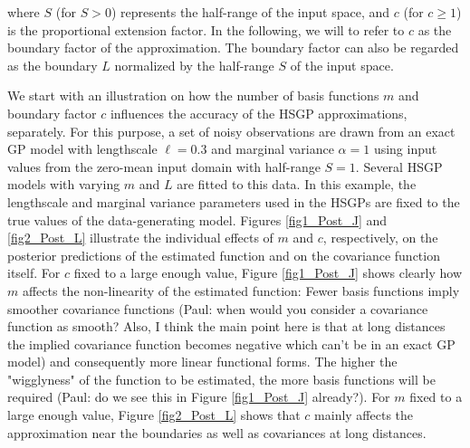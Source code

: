 \documentclass[]{interact}
\theoremstyle{plain}%
\theoremstyle{definition}
\theoremstyle{remark}
\begin{document}
\noindent where $S$ (for $S > 0$) represents the half-range of the input space, and $c$ (for $c \geq 1$) is the proportional extension factor. In the following, we will to refer to $c$ as the boundary factor of the approximation. The boundary factor can also be regarded as the boundary $L$ normalized by the half-range $S$ of the input space.

We start with an illustration on how the number of basis functions $m$ and boundary factor $c$ influences the accuracy of the HSGP approximations, separately. For this purpose, a set of noisy observations are drawn from an exact GP model with lengthscale $\ell=0.3$ and marginal variance $\alpha=1$ using input values from the zero-mean input domain with half-range $S=1$. Several HSGP models with varying $m$ and $L$ are fitted to this data. In this example, the lengthscale and marginal variance parameters used in the HSGPs are fixed to the true values of the data-generating model. 
Figures \ref{fig1_Post_J} and \ref{fig2_Post_L} illustrate the individual effects of $m$ and $c$, respectively, on the posterior predictions of the estimated function and on the covariance function itself. For $c$ fixed to a large enough value, Figure \ref{fig1_Post_J} shows clearly how $m$ affects the non-linearity of the estimated function: Fewer basis functions imply smoother covariance functions (Paul: when would you consider a covariance function as smooth? Also, I think the main point here is that at long distances the implied covariance function becomes negative which can't be in an exact GP model) and consequently more linear functional forms. The higher the "wigglyness" of the function to be estimated, the more basis functions will be required (Paul: do we see this in Figure \ref{fig1_Post_J} already?). For $m$ fixed to a large enough value, Figure \ref{fig2_Post_L} shows that $c$ mainly affects the approximation near the boundaries as well as covariances at long distances.
\end{document}

